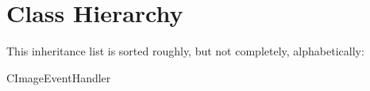 \section{Class Hierarchy}
This inheritance list is sorted roughly, but not completely, alphabetically\+:\begin{DoxyCompactList}
\item {}
\item C\+Image\+Event\+Handler\begin{DoxyCompactList}
\item {}
\end{DoxyCompactList}
\end{DoxyCompactList}
